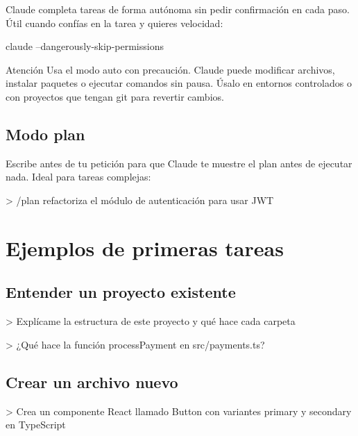 \documentclass[11pt,a4paper]{report}
\DeclareRobustCommand{\texttt}[1]{{\ttfamily\seqsplit{#1}}}
\begin{document}
Claude completa tareas de forma autónoma sin pedir confirmación en cada paso. Útil cuando confías en la tarea y quieres velocidad:

\begin{codebox}
claude --dangerously-skip-permissions
\end{codebox}

\begin{calloutbox}{Atención}
Usa el modo auto con precaución. Claude puede modificar archivos, instalar paquetes o ejecutar comandos sin pausa. Úsalo en entornos controlados o con proyectos que tengan git para revertir cambios.\end{calloutbox}

\subsection{Modo plan}

Escribe \texttt{/plan} antes de tu petición para que Claude te muestre el plan antes de ejecutar nada. Ideal para tareas complejas:

\begin{codebox}
> /plan refactoriza el módulo de autenticación para usar JWT
\end{codebox}

\section{Ejemplos de primeras tareas}

\subsection{Entender un proyecto existente}

\begin{codebox}
> Explícame la estructura de este proyecto y qué hace cada carpeta
\end{codebox}

\begin{codebox}
> ¿Qué hace la función processPayment en src/payments.ts?
\end{codebox}

\subsection{Crear un archivo nuevo}

\begin{codebox}
> Crea un componente React llamado Button con variantes primary y secondary en TypeScript
\end{codebox}
\end{document}
